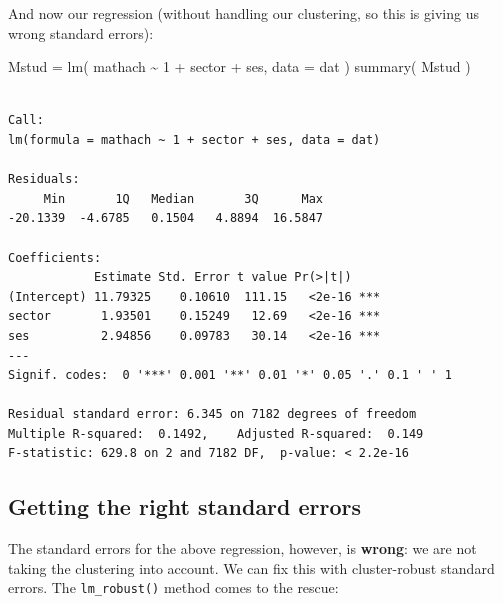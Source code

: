 \documentclass[
  letterpaper,
  DIV=11,
  numbers=noendperiod]{scrreprt}
\newenvironment{Shaded}{\begin{snugshade}}{\end{snugshade}}
\newcommand{\AttributeTok}[1]{\textcolor[rgb]{0.49,0.56,0.16}{#1}}
\newcommand{\DecValTok}[1]{\textcolor[rgb]{0.25,0.63,0.44}{#1}}
\newcommand{\FunctionTok}[1]{\textcolor[rgb]{0.02,0.16,0.49}{#1}}
\newcommand{\NormalTok}[1]{\textcolor[rgb]{0.00,0.44,0.13}{#1}}
\newcommand{\OtherTok}[1]{\textcolor[rgb]{0.00,0.44,0.13}{#1}}
\newcommand{\SpecialCharTok}[1]{\textcolor[rgb]{0.25,0.44,0.63}{#1}}
\begin{document}
And now our regression (without handling our clustering, so this is
giving us wrong standard errors):

\begin{Shaded}
\begin{Highlighting}[]
\NormalTok{Mstud }\OtherTok{=} \FunctionTok{lm}\NormalTok{( mathach }\SpecialCharTok{\textasciitilde{}} \DecValTok{1} \SpecialCharTok{+}\NormalTok{ sector }\SpecialCharTok{+}\NormalTok{ ses, }\AttributeTok{data =}\NormalTok{ dat )}
\FunctionTok{summary}\NormalTok{( Mstud )}
\end{Highlighting}
\end{Shaded}

\begin{verbatim}

Call:
lm(formula = mathach ~ 1 + sector + ses, data = dat)

Residuals:
     Min       1Q   Median       3Q      Max 
-20.1339  -4.6785   0.1504   4.8894  16.5847 

Coefficients:
            Estimate Std. Error t value Pr(>|t|)    
(Intercept) 11.79325    0.10610  111.15   <2e-16 ***
sector       1.93501    0.15249   12.69   <2e-16 ***
ses          2.94856    0.09783   30.14   <2e-16 ***
---
Signif. codes:  0 '***' 0.001 '**' 0.01 '*' 0.05 '.' 0.1 ' ' 1

Residual standard error: 6.345 on 7182 degrees of freedom
Multiple R-squared:  0.1492,    Adjusted R-squared:  0.149 
F-statistic: 629.8 on 2 and 7182 DF,  p-value: < 2.2e-16
\end{verbatim}

\hypertarget{getting-the-right-standard-errors}{%
\subsection{Getting the right standard
errors}\label{getting-the-right-standard-errors}}

The standard errors for the above regression, however, is
\textbf{wrong}: we are not taking the clustering into account. We can
fix this with cluster-robust standard errors. The \texttt{lm\_robust()}
method comes to the rescue:

\begin{Shaded}
\end{Shaded}
\end{document}
